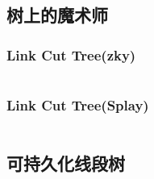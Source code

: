 \documentclass[landscape, oneside, a4paper, cs4size]{book}
\newcommand{\cppcode}[1]{
	\inputminted[mathescape,
	frame=lines,linenos]{cpp}{source/#1}
}
\begin{document}
\begin{multicols}{2}
\begin{spacing}{0.8}
\subsection{树上的魔术师}








\subsubsection{Link Cut Tree(zky)}

\cppcode{data-structure/LCT.cpp}


\subsubsection{Link Cut Tree(Splay)}

\cppcode{data-structure/Link-cut-tree.cpp}








\subsection{可持久化线段树}

\cppcode{data-structure/ChairTree.cpp}




\end{spacing}
\end{multicols}
\end{document}
